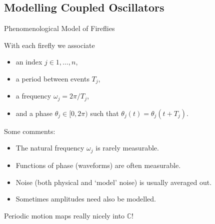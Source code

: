\documentclass[10pt,reqno]{beamer}
\newcommand{\complex}{\mathbb{C}}
\begin{document}
\subsection{Modelling Coupled Oscillators}
\begin{frame}{Phenomenological Model of Fireflies}
\begin{minipage}{0.46\textwidth}
	\begin{figure}
	\end{figure}
\end{minipage}\hfill
\begin{minipage}{0.46\textwidth}
	With each firefly we associate
	\begin{itemize}
		\item an index $j \in 1,\ldots,n$, 
		\item a period between events $T_j$,
		\item a frequency $\omega_j = 2\pi/T_j$,
		\item and a phase $\theta_j \in [0,2\pi)$  such that $\theta_j(t) = \theta_j(t+T_j)$.
	\end{itemize}
\end{minipage}

\vspace{15pt}

Some comments:
\begin{itemize}
	\item The natural frequency $\omega_j$ is rarely measurable.
	\item Functions of phase (waveforms) are often measurable.
	\item Noise (both physical and `model' noise) is usually averaged out.
	\item Sometimes amplitudes need also be modelled.
\end{itemize}

\begin{center}
	\vfill
	Periodic motion maps really nicely into $\complex$!
\end{center}
\end{frame}
\end{document}
